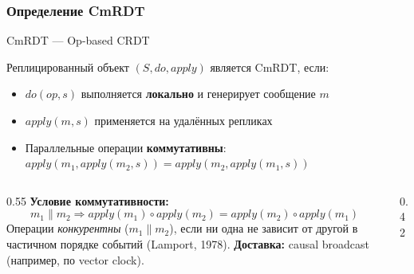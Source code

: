 \documentclass{beamer}
\newenvironment{definitionbox}[1][Определение]{%
  \begin{exampleblock}{#1}
}{%
  \end{exampleblock}
}
\begin{document}
\begin{frame}
\frametitle{Определение CmRDT}

\begin{definitionbox}[CmRDT — Op-based CRDT]
Реплицированный объект $(S, \mathit{do}, \mathit{apply})$ является CmRDT, если:
\begin{itemize}
  \item $\mathit{do}(op, s)$ выполняется \textbf{локально} и генерирует сообщение $m$
  \item $\mathit{apply}(m, s)$ применяется на удалённых репликах
  \item Параллельные операции \textbf{коммутативны}: $\mathit{apply}(m_1, \mathit{apply}(m_2,s)) = \mathit{apply}(m_2, \mathit{apply}(m_1,s))$
\end{itemize}
\end{definitionbox}

\begin{columns}
\begin{column}{0.55\textwidth}
\textbf{Условие коммутативности:}
\[
  m_1 \parallel m_2 \Rightarrow \mathit{apply}(m_1) \circ \mathit{apply}(m_2) = \mathit{apply}(m_2) \circ \mathit{apply}(m_1)
\]
Операции \emph{конкурентны} ($m_1 \parallel m_2$), если ни одна не зависит от другой в частичном порядке событий (Lamport, 1978).
\textbf{Доставка:} causal broadcast (например, по vector clock).
\end{column}
\begin{column}{0.42\textwidth}
\end{column}
\end{columns}

\end{frame}
\end{document}
